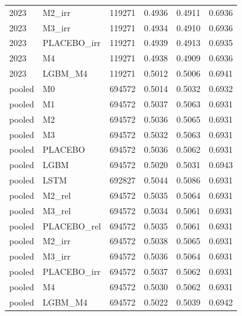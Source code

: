 \begin{tabular}{llrrrr}
2023 & M2\_irr & 119271 & 0.4936 & 0.4911 & 0.6936 \\
2023 & M3\_irr & 119271 & 0.4934 & 0.4910 & 0.6936 \\
2023 & PLACEBO\_irr & 119271 & 0.4939 & 0.4913 & 0.6935 \\
2023 & M4 & 119271 & 0.4938 & 0.4909 & 0.6936 \\
2023 & LGBM\_M4 & 119271 & 0.5012 & 0.5006 & 0.6941 \\
pooled & M0 & 694572 & 0.5014 & 0.5032 & 0.6932 \\
pooled & M1 & 694572 & 0.5037 & 0.5063 & 0.6931 \\
pooled & M2 & 694572 & 0.5036 & 0.5065 & 0.6931 \\
pooled & M3 & 694572 & 0.5032 & 0.5063 & 0.6931 \\
pooled & PLACEBO & 694572 & 0.5036 & 0.5062 & 0.6931 \\
pooled & LGBM & 694572 & 0.5020 & 0.5031 & 0.6943 \\
pooled & LSTM & 692827 & 0.5044 & 0.5086 & 0.6931 \\
pooled & M2\_rel & 694572 & 0.5035 & 0.5064 & 0.6931 \\
pooled & M3\_rel & 694572 & 0.5034 & 0.5061 & 0.6931 \\
pooled & PLACEBO\_rel & 694572 & 0.5035 & 0.5061 & 0.6931 \\
pooled & M2\_irr & 694572 & 0.5038 & 0.5065 & 0.6931 \\
pooled & M3\_irr & 694572 & 0.5036 & 0.5064 & 0.6931 \\
pooled & PLACEBO\_irr & 694572 & 0.5037 & 0.5062 & 0.6931 \\
pooled & M4 & 694572 & 0.5030 & 0.5062 & 0.6931 \\
pooled & LGBM\_M4 & 694572 & 0.5022 & 0.5039 & 0.6942 \\
\bottomrule
\end{tabular}
